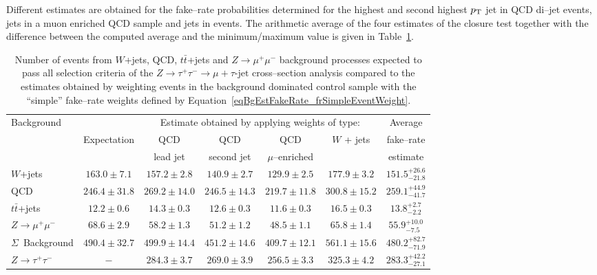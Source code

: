 Different estimates are obtained for the fake--rate probabilities determined for
the highest and second highest $p_{\mathrm{T}}$ jet in QCD di--jet events, jets in a muon
enriched QCD sample and jets in \WpJets events.  The arithmetic average of the
four estimates of the closure test together with the difference between the
computed average and the minimum/maximum value is given in
Table~\ref{tabBgEstFakeRate_frSimpleResults}.
%
\begin{table}
\begin{center}
\begin{tabular}{|l|c|c|c|c|c|c|}
\hline
\multirow{2}{22mm}{Background}  &             & \multicolumn{4}{c|}{Estimate obtained by applying weights of type:} & Average \\
\multirow{2}{18mm}{Process}     & Expectation & QCD       & QCD        & QCD             & \multirow{2}{18mm}{$W$ + jets} & fake--rate \\
                                &             & lead jet & second jet & $\mu$--enriched &                                & estimate \\
\hline
\hline
$W$+jets                        & $163.0 \pm  7.1$ & $157.2 \pm  2.8$ & $140.9 \pm  2.7$ & $129.9 \pm  2.5$ & $177.9 \pm  3.2$ & $151.5^{+26.6}_{-21.8}$ \\
QCD                             & $246.4 \pm 31.8$ & $269.2 \pm 14.0$ & $246.5 \pm 14.3$ & $219.7 \pm 11.8$ & $300.8 \pm 15.2$ & $259.1^{+44.9}_{-41.7}$ \\
$t\bar{t}$+jets                 & $ 12.2 \pm  0.6$ & $ 14.3 \pm  0.3$ & $ 12.6 \pm  0.3$ & $ 11.6 \pm  0.3$ & $ 16.5 \pm  0.3$ & $ 13.8^{+2.7}_{-2.2}$ \\
$Z \rightarrow \mu^{+} \mu^{-}$ & $ 68.6 \pm  2.9$ & $ 58.2 \pm  1.3$ & $ 51.2 \pm  1.2$ & $ 48.5 \pm  1.1$ & $ 65.8 \pm  1.4$ & $ 55.9^{+10.0}_{-7.5}$ \\
\hline
$\Sigma$~Background             & $490.4 \pm 32.7$ & $499.9 \pm 14.4$ & $451.2 \pm 14.6$ & $409.7 \pm 12.1$ & $561.1 \pm 15.6$ & $480.2^{+82.7}_{-71.9}$ \\     
\hline
\hline
$Z \rightarrow \tau^{+} \tau^{-}$ & $-$ & $284.3 \pm 3.7$ & $269.0 \pm 3.9$ & $256.5 \pm 3.3$ & $325.3 \pm 4.2$ & $283.3^{+42.2}_{-27.1}$ \\
\hline
\end{tabular}
\end{center}
\begin{center}
\caption[Fake--rate ``simple'' method closure test results]{\captiontext Number
of events from $W$+jets, QCD, $t\bar{t}$+jets and $Z \rightarrow \mu^{+}
\mu^{-}$ background processes expected to pass all selection criteria of the $Z
\rightarrow \tau^{+} \tau^{-} \rightarrow \mu + \tau\mbox{-jet}$ cross--section
analysis compared to the estimates obtained by weighting events in the
background dominated control sample with the ``simple'' fake--rate weights
defined by Equation~\ref{eqBgEstFakeRate_frSimpleEventWeight}.}
\label{tabBgEstFakeRate_frSimpleResults}
\end{center}
\end{table}

